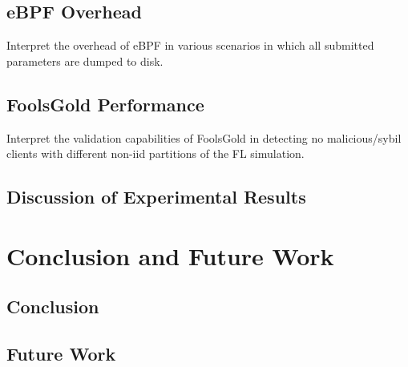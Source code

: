 \documentclass{article}
\begin{document}
\subsection{eBPF Overhead}
Interpret the overhead of eBPF in various scenarios in which all submitted
parameters are dumped to disk.

\subsection{FoolsGold Performance}
Interpret the validation capabilities of FoolsGold in detecting no
malicious/sybil clients with different non-iid partitions of the FL simulation.

\subsection{Discussion of Experimental Results}

\section{Conclusion and Future Work}
\subsection{Conclusion}
\subsection{Future Work}
\end{document}
